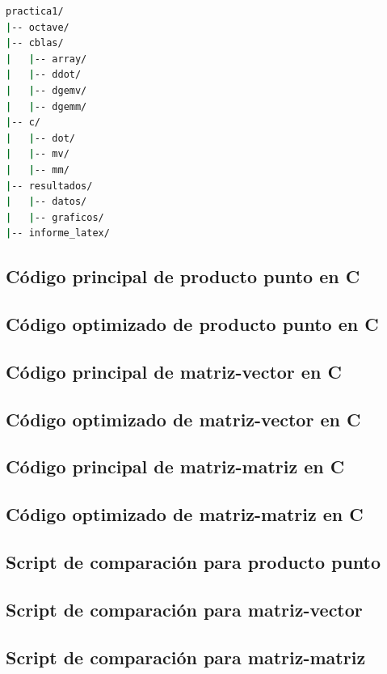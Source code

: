 \documentclass[12pt,letterpaper]{article}
\begin{document}
\begin{lstlisting}[language=bash]
practica1/
|-- octave/
|-- cblas/
|   |-- array/
|   |-- ddot/
|   |-- dgemv/
|   |-- dgemm/
|-- c/
|   |-- dot/
|   |-- mv/
|   |-- mm/
|-- resultados/
|   |-- datos/
|   |-- graficos/
|-- informe_latex/
\end{lstlisting}

\subsection{Código principal de producto punto en C}



\subsection{Código optimizado de producto punto en C}



\subsection{Código principal de matriz-vector en C}



\subsection{Código optimizado de matriz-vector en C}



\subsection{Código principal de matriz-matriz en C}



\subsection{Código optimizado de matriz-matriz en C}



\subsection{Script de comparación para producto punto}



\subsection{Script de comparación para matriz-vector}



\subsection{Script de comparación para matriz-matriz}


\end{document}
